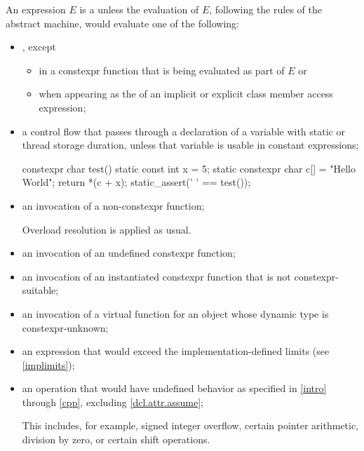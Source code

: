 \pnum
An expression $E$ is a 
unless the evaluation of $E$, following the rules of the abstract
machine, would evaluate one of the following:
\begin{itemize}
\item
{}, except
\begin{itemize}
\item
in a constexpr function
that is being evaluated as part of $E$ or
\item
when appearing as the  of
an implicit or explicit class member access expression;
\end{itemize}

\item
a control flow that passes through
a declaration of a variable with
static or
thread storage duration,
unless that variable is usable in constant expressions;
\begin{example}
\begin{codeblock}
constexpr char test() {
  static const int x = 5;
  static constexpr char c[] = "Hello World";
  return *(c + x);
}
static_assert(' ' == test());
\end{codeblock}
\end{example}

\item
an invocation of a non-constexpr function;
\begin{footnote}
Overload resolution
is applied as usual.
\end{footnote}

\item
an invocation of an undefined constexpr function;

\item
an invocation of an instantiated constexpr function
that is not constexpr-suitable;

\item
an invocation of a virtual function
for an object whose dynamic type is constexpr-unknown;

\item
an expression that would exceed the implementation-defined
limits (see \ref{implimits});

\item
an operation that would have undefined behavior
as specified in \ref{intro} through \ref{cpp},
excluding \ref{dcl.attr.assume};
\begin{footnote}
This includes,
for example, signed integer overflow, certain
pointer arithmetic, division by
zero, or certain shift operations.
\end{footnote}


\end{itemize}
